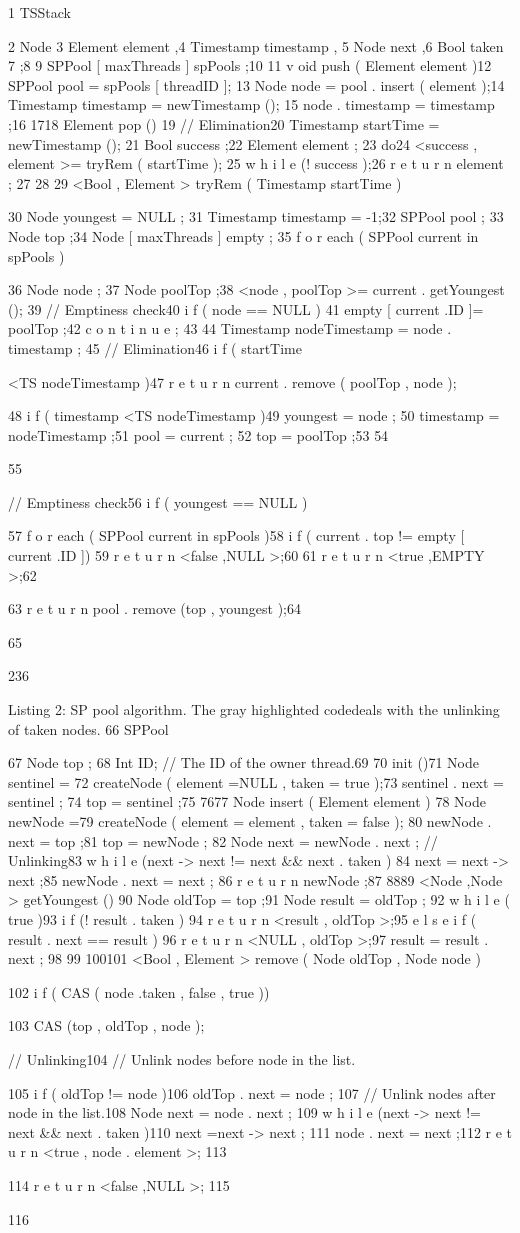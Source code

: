 1 TSStack {2 Node {
3 Element element ,4 Timestamp timestamp ,
5 Node next ,6 Bool taken
7 };8
9 SPPool [ maxThreads ] spPools ;10
11 v oid push ( Element element ){12 SPPool pool = spPools [ threadID ];
13 Node node = pool . insert ( element );14 Timestamp timestamp = newTimestamp ();
15 node . timestamp = timestamp ;16 }
1718 Element pop (){
19 // Elimination20 Timestamp startTime = newTimestamp ();
21 Bool success ;22 Element element ;
23 do{24 <success , element >= tryRem ( startTime );
25 } w h i l e (! success );26 r e t u r n element ;
27 }28
29 <Bool , Element > tryRem ( Timestamp startTime ){30 Node youngest = NULL ;
31 Timestamp timestamp = -1;32 SPPool pool ;
33 Node top ;34 Node [ maxThreads ] empty ;
35 f o r each ( SPPool current in spPools ){36 Node node ;
37 Node poolTop ;38 <node , poolTop >= current . getYoungest ();
39 // Emptiness check40 i f ( node == NULL ){
41 empty [ current .ID ]= poolTop ;42 c o n t i n u e ;
43 }44 Timestamp nodeTimestamp = node . timestamp ;
45 // Elimination46 i f ( startTime

<TS nodeTimestamp )47 r e t u r n current . remove ( poolTop , node );

48 i f ( timestamp <TS nodeTimestamp ){49 youngest = node ;
50 timestamp = nodeTimestamp ;51 pool = current ;
52 top = poolTop ;53 }
54 }55

// Emptiness check56 i f ( youngest == NULL ){

57 f o r each ( SPPool current in spPools ){58 i f ( current . top != empty [ current .ID ])
59 r e t u r n <false ,NULL >;60 }
61 r e t u r n <true ,EMPTY >;62 }
63 r e t u r n pool . remove (top , youngest );64 }
65 }

236

Listing 2: SP pool algorithm. The gray highlighted codedeals with the unlinking of taken nodes.
66 SPPool {67 Node top ;
68 Int ID; // The ID of the owner thread.69
70 init (){71 Node sentinel =
72 createNode ( element =NULL , taken = true );73 sentinel . next = sentinel ;
74 top = sentinel ;75 }
7677 Node insert ( Element element ){
78 Node newNode =79 createNode ( element = element , taken = false );
80 newNode . next = top ;81 top = newNode ;
82 Node next = newNode . next ; // Unlinking83 w h i l e (next -> next != next && next . taken )
84 next = next -> next ;85 newNode . next = next ;
86 r e t u r n newNode ;87 }
8889 <Node ,Node > getYoungest (){
90 Node oldTop = top ;91 Node result = oldTop ;
92 w h i l e ( true ){93 i f (! result . taken )
94 r e t u r n <result , oldTop >;95 e l s e i f ( result . next == result )
96 r e t u r n <NULL , oldTop >;97 result = result . next ;
98 }99 }
100101 <Bool , Element > remove ( Node oldTop , Node node ){
102 i f ( CAS ( node .taken , false , true )){103 CAS (top , oldTop , node );

// Unlinking104 // Unlink nodes before node in the list.

105 i f ( oldTop != node )106 oldTop . next = node ;
107 // Unlink nodes after node in the list.108 Node next = node . next ;
109 w h i l e (next -> next != next && next . taken )110 next =next -> next ;
111 node . next = next ;112 r e t u r n <true , node . element >;
113 }114 r e t u r n <false ,NULL >;
115 }116 }

